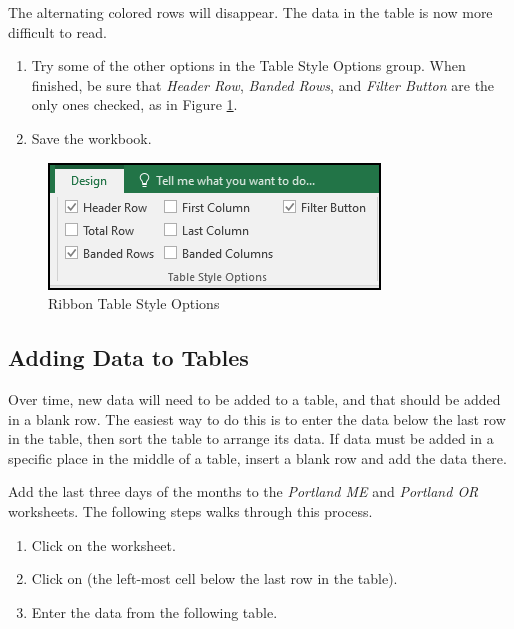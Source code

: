 The alternating colored rows will disappear. The data in the table is now more difficult to read.

\begin{enumerate}[resume]
	\item Try some of the other options in the Table Style Options group. When finished, be sure that \textit{Header Row}, \textit{Banded Rows}, and \textit{Filter Button} are the only ones checked, as in Figure \ref{05:fig05}.
	\item Save the workbook.
\end{enumerate}

\begin{figure}[H]
	\centering
	\includegraphics[width=\maxwidth{.65\linewidth}]{gfx/ch05_fig05}
	\caption{Ribbon Table Style Options}
	\label{05:fig05}
\end{figure}

\subsection{Adding Data to Tables}

Over time, new data will need to be added to a table, and that should be added in a blank row. The easiest way to do this is to enter the data below the last row in the table, then sort the table to arrange its data. If data must be added in a specific place in the middle of a table, insert a blank row and add the data there.

Add the last three days of the months to the \textit{Portland ME} and \textit{Portland OR} worksheets. The following steps walks through this process.

\begin{enumerate}
	\item Click on the  worksheet.
	\item Click on  (the left-most cell below the last row in the table).
	\item Enter the data from the following table.
\end{enumerate}

